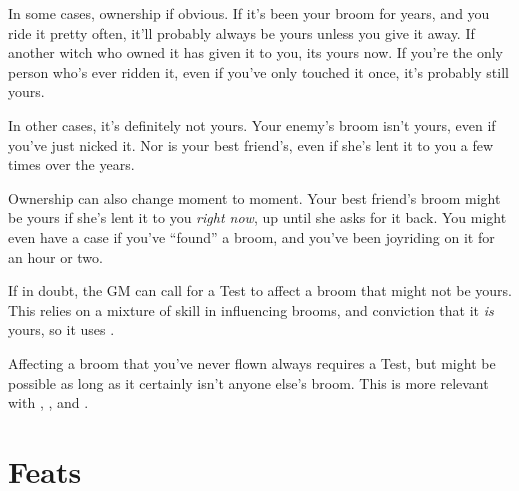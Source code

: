 In some cases, ownership if obvious.
If it's been your broom for years, and you ride it pretty often, it'll probably always be yours unless you give it away.
If another witch who owned it has given it to you, its yours now.
If you're the only person who's ever ridden it, even if you've only touched it once, it's probably still yours.

In other cases, it's definitely not yours.
Your enemy's broom isn't yours, even if you've just nicked it.
Nor is your best friend's, even if she's lent it to you a few times over the years.

Ownership can also change moment to moment.
Your best friend's broom might be yours if she's lent it to you \emph{right now}, up until she asks for it back.
You might even have a case if you've ``found'' a broom, and you've been joyriding on it for an hour or two.

If in doubt, the GM can call for a Test to affect a broom that might not be yours.
This relies on a mixture of skill in influencing brooms, and conviction that it \emph{is} yours, so it uses .

Affecting a broom that you've never flown always requires a Test, but might be possible as long as it certainly isn't anyone else's broom.
This is more relevant with , , and .

\section{Feats}



